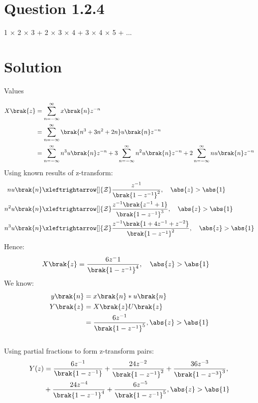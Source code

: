 \documentclass[journal,12pt,twocolumn]{IEEEtran}
\theoremstyle{remark}
\begin{document}
\section{Question 1.2.4}
1 $\times$ 2 $\times$  3 + 2 $\times$ 3 $\times$ 4 + 3 $\times$ 4 $\times$ 5 + ...
\section{Solution}
\begin{table}[!h]
    \centering
     \vspace{0.5cm}
    \caption{Values} 
    \label{tab:mytable}
\end{table}
\begin{align}
 X\brak{z} &= \sum_{n=-\infty}^\infty x \brak{n}  z^{-n}\\
  &= \sum_{n=-\infty}^\infty \brak{n^{3} + 3n^{2} + 2n} u\brak{n} z^{-n}\\
  &= \sum_{n=-\infty}^\infty n^{3} u \brak{n} z^{-n} + 3 \sum_{n=-\infty}^\infty n^{2} u \brak{n} z^{-n}+ 2\sum_{n=-\infty}^\infty n u \brak{n} z^{-n}
 \end{align}
 Using known results of z-transform:
 \begin{align}
 n u \brak{n} &\xleftrightarrow[]{\mathcal{Z}} \frac{z^{-1}}{\brak{1- z^{-1}}^2}, \quad \abs{z} > \abs{1}\\
 n^2 u \brak{n} &\xleftrightarrow[]{\mathcal{Z}} \frac{z^{-1} \brak{z^{-1} + 1}}{\brak{1- z^{-1}}^3}, \quad \abs{z} > \abs{1} \\
 n^3 u \brak{n} &\xleftrightarrow[]{\mathcal{Z}} \frac{z^{-1} \brak{1 + 4z^{-1} + z^{-2}} }{\brak{1- z^{-1}}^2}, \quad \abs{z} > \abs{1}
 \end{align}
 Hence:
 \begin{align}
 X\brak{z}&= \frac{6z^-1}{\brak{1-z^{-1}}^4} , \quad \abs{z} > \abs{1}
 \end{align}
We know:
\begin{align}
y\brak{n} &= x\brak{n}\ast u\brak{n}\\
    Y\brak{z} &= X\brak{z} U\brak{z} \\
 &= \frac{6z^{-1}}{\brak{1-z^{-1}}^5} , \abs{z}> \abs{1} 
\end{align}
\\
Using partial fractions to form z-transform pairs:
\\
\begin{align}
Y(z) &= \frac{6z^{-1}}{\brak{1-z^{-1}}} + \frac{24z^{-2}}{\brak{1-z^{-1}}^2} + \frac{36z^{-3}}{\brak{1-z^{-3}}^3} , \\
    &+ \frac{24z^{-4}}{\brak{1-z^{-1}}^4}+\frac{6z^{-5}}{\brak{1-z^{-1}}^5} , \abs{z}>\abs{1} 
\end{align}
\end{document}
